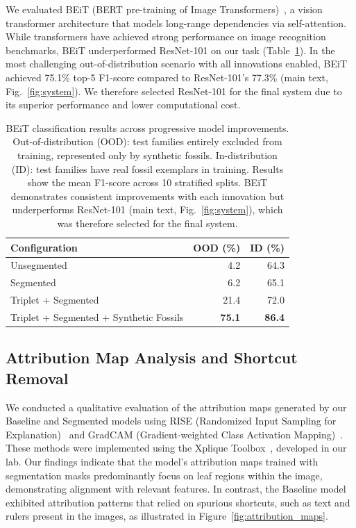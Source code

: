 \documentclass[pdflatex,lineno,sn-nature]{sn-jnl}%
\theoremstyle{plain}%
\theoremstyle{definition}%
\theoremstyle{remark}%
\begin{document}
\begin{oldappendices}
We evaluated BEiT (BERT pre-training of Image Transformers)~\citep{bao2022beit}, 
a vision transformer architecture that models long-range dependencies via 
self-attention. While transformers have achieved strong performance on image 
recognition benchmarks, BEiT underperformed ResNet-101 on our task 
(Table~\ref{tab:beit}). In the most challenging out-of-distribution scenario 
with all innovations enabled, BEiT achieved 75.1\% top-5 F1-score compared to 
ResNet-101's 77.3\% (main text, Fig.~\ref{fig:system}). We therefore selected 
ResNet-101 for the final system due to its superior performance and lower 
computational cost.


\begin{table}[ht!]
\centering
\caption{BEiT classification results across progressive model improvements. 
Out-of-distribution (OOD): test families entirely excluded from training, represented 
only by synthetic fossils. In-distribution (ID): test families have real fossil 
exemplars in training. Results show the mean F1-score across 10 stratified splits. 
BEiT demonstrates consistent improvements with each innovation but underperforms 
ResNet-101 (main text, Fig.~\ref{fig:system}), which was therefore selected for 
the final system.}
\label{tab:beit}
\vspace{0.5em}
\begin{tabular}{@{}lrr@{}}
\toprule
\textbf{Configuration} & \textbf{OOD (\%)} & \textbf{ID (\%)}  \\
\midrule
Unsegmented & 4.2 & 64.3  \\
Segmented & 6.2 & 65.1  \\
Triplet + Segmented & 21.4 & 72.0 \\
Triplet + Segmented + Synthetic Fossils & \textbf{75.1} & \textbf{86.4}  \\
\bottomrule
\end{tabular}
\end{table}



\subsection{Attribution Map Analysis and Shortcut Removal}

We conducted a qualitative evaluation of the attribution maps generated by our Baseline and Segmented models using RISE (Randomized Input Sampling for Explanation)~\citep{petsiuk2018rise} and GradCAM (Gradient-weighted Class Activation Mapping)~\citep{Selvaraju_2019}. These methods were implemented using the Xplique Toolbox~\citep{fel2022xplique}, developed in our lab. Our findings indicate that the model's attribution maps trained with segmentation masks predominantly focus on leaf regions within the image, demonstrating alignment with relevant features. In contrast, the Baseline model exhibited attribution patterns that relied on spurious shortcuts, such as text and rulers present in the images, as illustrated in Figure~\ref{fig:attribution_maps}.


\end{oldappendices}
\end{document}
